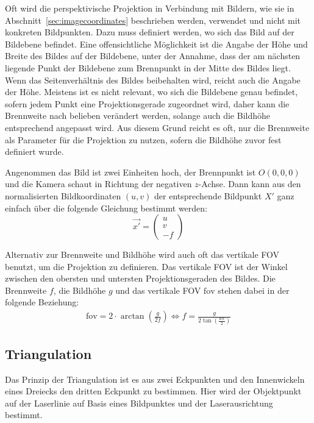 \documentclass[ngerman,a4paper,parskip=half]{scrartcl}
\def \fov{\mathrm{fov}}
\begin{document}
Oft wird die perspektivische Projektion in Verbindung mit Bildern, wie sie in Abschnitt~\ref{sec:imagecoordinates} beschrieben werden, verwendet und nicht mit konkreten Bildpunkten. Dazu muss definiert werden, wo sich das Bild auf der Bildebene befindet. Eine offensichtliche Möglichkeit ist die Angabe der Höhe und Breite des Bildes auf der Bildebene, unter der Annahme, dass der am nächsten liegende Punkt der Bildebene zum Brennpunkt in der Mitte des Bildes liegt. Wenn das Seitenverhältnis des Bildes beibehalten wird, reicht auch die Angabe der Höhe. Meistens ist es nicht relevant, wo sich die Bildebene genau befindet, sofern jedem Punkt eine Projektionsgerade zugeordnet wird, daher kann die Brennweite nach belieben verändert werden, solange auch die Bildhöhe entsprechend angepasst wird. Aus diesem Grund reicht es oft, nur die Brennweite als Parameter für die Projektion zu nutzen, sofern die Bildhöhe zuvor fest definiert wurde.

Angenommen das Bild ist zwei Einheiten hoch, der Brennpunkt ist $O(0,0,0)$ und die Kamera schaut in Richtung der negativen $z$-Achse. Dann kann aus den normalisierten Bildkoordinaten $(u,v)$ der entsprechende Bildpunkt $X'$ ganz einfach über die folgende Gleichung bestimmt werden:
\[ \vec{x'} = \begin{pmatrix}
u \\ v \\ -f
\end{pmatrix} \]

Alternativ zur Brennweite und Bildhöhe wird auch oft das vertikale \ac{FOV} benutzt, um die Projektion zu definieren. Das vertikale \ac{FOV} ist der Winkel zwischen den obersten und untersten Projektionsgeraden des Bildes. Die Brennweite $f$, die Bildhöhe $g$ und das vertikale \ac{FOV} $\fov$ stehen dabei in der folgende Beziehung:
\begin{align*}
	\fov = 2 \cdot \arctan \left( \frac{g}{2 f} \right)
	\Leftrightarrow f = \frac{g}{2 \tan\left(\frac{\fov}{2}\right)}
\end{align*}

\subsection{Triangulation}

Das Prinzip der Triangulation ist es aus zwei Eckpunkten und den Innenwickeln eines Dreiecks den dritten Eckpunkt zu bestimmen. Hier wird der Objektpunkt auf der Laserlinie auf Basis eines Bildpunktes und der Laserausrichtung bestimmt.
\end{document}
